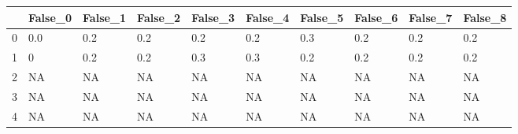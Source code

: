 \begin{tabular}{llllllllll}
\toprule
{} & False\_0 & False\_1 & False\_2 & False\_3 & False\_4 & False\_5 & False\_6 & False\_7 & False\_8 \\ \hline
\midrule
0 &     0.0 &     0.2 &     0.2 &     0.2 &     0.2 &     0.3 &     0.2 &     0.2 &     0.2 \\ \hline
1 &       0 &     0.2 &     0.2 &     0.3 &     0.3 &     0.2 &     0.2 &     0.2 &     0.2 \\ \hline
2 &      NA &      NA &      NA &      NA &      NA &      NA &      NA &      NA &      NA \\ \hline
3 &      NA &      NA &      NA &      NA &      NA &      NA &      NA &      NA &      NA \\ \hline
4 &      NA &      NA &      NA &      NA &      NA &      NA &      NA &      NA &      NA \\ \hline
\bottomrule
\end{tabular}
